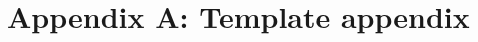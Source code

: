 \documentclass[11pt]{article}
\begin{document}

\clearpage

\section*{Appendix A: Template appendix}
\label{sec:appa}
\end{document}
